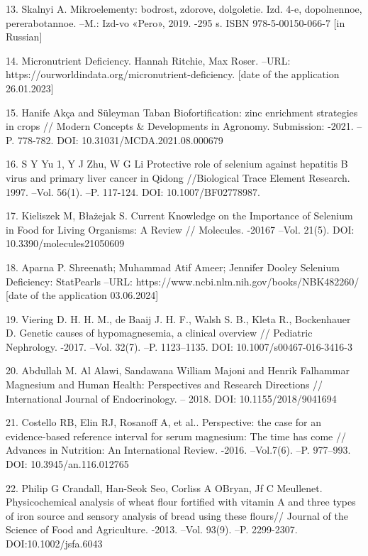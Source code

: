 13. Skal\textquotesingle nyi A. Mikroelementy: bodrost\textquotesingle,
zdorov\textquotesingle e, dolgoletie. Izd. 4-e, dopolnennoe,
pererabotannoe. --M.: Izd-vo «Pero», 2019. -295 s. ISBN
978-5-00150-066-7 {[}in Russian{]}

14. Micronutrient Deficiency. Hannah Ritchie, Max Roser. --URL:
https://ourworldindata.org/micronutrient-deficiency. {[}date of the
application 26.01.2023{]}

15. Hanife Akça and Süleyman Taban Biofortification: zinc enrichment
strategies in crops // Modern Concepts \& Developments in Agronomy.
Submission: -2021. --P. 778-782. DOI: 10.31031/MCDA.2021.08.000679

16. S Y Yu 1, Y J Zhu, W G Li Protective role of selenium against
hepatitis B virus and primary liver cancer in Qidong //Biological Trace
Element Research. 1997. --Vol. 56(1). --P. 117-124. DOI:
10.1007/BF02778987.

17. Kieliszek M, Błażejak S. Current Knowledge on the Importance of
Selenium in Food for Living Organisms: A Review // Molecules. -20167
--Vol. 21(5). DOI: 10.3390/molecules21050609

18. Aparna P. Shreenath; Muhammad Atif Ameer; Jennifer Dooley Selenium
Deficiency: StatPearls --URL:
https://www.ncbi.nlm.nih.gov/books/NBK482260/ {[}date of the application
03.06.2024{]}

19. Viering D. H. H. M., de Baaij J. H. F., Walsh S. B., Kleta R.,
Bockenhauer D. Genetic causes of hypomagnesemia, a clinical overview //
Pediatric Nephrology. -2017. --Vol. 32(7). --P. 1123--1135. DOI:
10.1007/s00467-016-3416-3

20. Abdullah M. Al Alawi, Sandawana William Majoni and Henrik Falhammar
Magnesium and Human Health: Perspectives and Research Directions //
International Journal of Endocrinology. -- 2018. DOI:
10.1155/2018/9041694

21. Costello RB, Elin RJ, Rosanoff A, et al.. Perspective: the case for
an evidence-based reference interval for serum magnesium: The time has
come // Advances in Nutrition: An International Review. -2016.
--Vol.7(6). --P. 977--993. DOI: 10.3945/an.116.012765

22. Philip G Crandall, Han-Seok Seo, Corliss A O\textquotesingle Bryan,
Jf C Meullenet. Physicochemical analysis of wheat flour fortified with
vitamin A and three types of iron source and sensory analysis of bread
using these flours// Journal of the Science of Food and Agriculture.
-2013. --Vol. 93(9). --P. 2299-2307. DOI:10.1002/jsfa.6043

